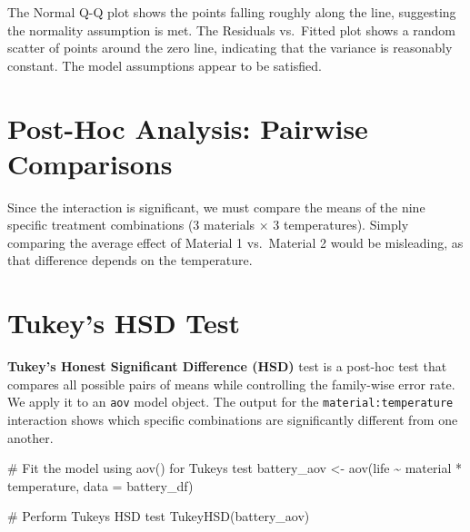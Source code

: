 \documentclass[
  letterpaper,
  DIV=11,
  numbers=noendperiod]{scrreprt}
\newenvironment{Shaded}{\begin{snugshade}}{\end{snugshade}}
\newcommand{\AttributeTok}[1]{\textcolor[rgb]{0.40,0.45,0.13}{#1}}
\newcommand{\CommentTok}[1]{\textcolor[rgb]{0.37,0.37,0.37}{#1}}
\newcommand{\FunctionTok}[1]{\textcolor[rgb]{0.28,0.35,0.67}{#1}}
\newcommand{\NormalTok}[1]{\textcolor[rgb]{0.00,0.23,0.31}{#1}}
\newcommand{\OtherTok}[1]{\textcolor[rgb]{0.00,0.23,0.31}{#1}}
\newcommand{\SpecialCharTok}[1]{\textcolor[rgb]{0.37,0.37,0.37}{#1}}
\begin{document}
The Normal Q-Q plot shows the points falling roughly along the line,
suggesting the normality assumption is met. The Residuals vs.~Fitted
plot shows a random scatter of points around the zero line, indicating
that the variance is reasonably constant. The model assumptions appear
to be satisfied.

\section{Post-Hoc Analysis: Pairwise
Comparisons}\label{post-hoc-analysis-pairwise-comparisons}

Since the interaction is significant, we must compare the means of the
nine specific treatment combinations (3 materials × 3 temperatures).
Simply comparing the average effect of Material 1 vs.~Material 2 would
be misleading, as that difference depends on the temperature.

\section{Tukey's HSD Test}\label{tukeys-hsd-test-2}

\textbf{Tukey's Honest Significant Difference (HSD)} test is a post-hoc
test that compares all possible pairs of means while controlling the
family-wise error rate. We apply it to an \texttt{aov} model object. The
output for the \texttt{material:temperature} interaction shows which
specific combinations are significantly different from one another.

\begin{Shaded}
\begin{Highlighting}[]
\CommentTok{\# Fit the model using aov() for Tukey\textquotesingle{}s test}
\NormalTok{battery\_aov }\OtherTok{\textless{}{-}} \FunctionTok{aov}\NormalTok{(life }\SpecialCharTok{\textasciitilde{}}\NormalTok{ material }\SpecialCharTok{*}\NormalTok{ temperature, }\AttributeTok{data =}\NormalTok{ battery\_df)}

\CommentTok{\# Perform Tukey\textquotesingle{}s HSD test}
\FunctionTok{TukeyHSD}\NormalTok{(battery\_aov)}
\end{Highlighting}
\end{Shaded}
\end{document}
